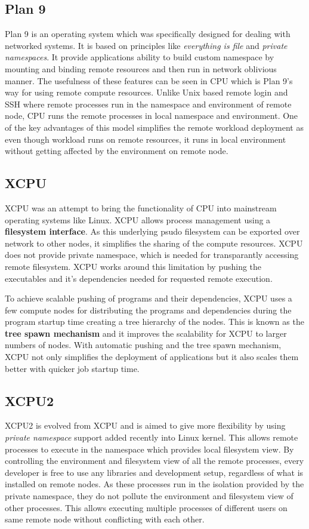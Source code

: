 \documentclass[conference]{IEEEtran}
\begin{document}
\subsection{Plan 9}
Plan 9 is an operating system which was specifically designed for dealing with
networked systems.  It is based on principles like \textit{everything is file}
and \textit{private namespaces}\cite{namespace}.  It provide applications
ability to build custom namespace by mounting and binding remote resources and
then run in network oblivious manner.  The usefulness of these features can be
seen in CPU\cite{plan9-cpu} which is Plan 9's way for using remote compute
resources.  Unlike Unix based remote login and SSH where remote processes run
in the namespace and environment of remote node, CPU runs the remote processes
in local namespace and environment.  One of the key advantages of this model
simplifies the remote workload deployment as even though workload runs on
remote resources, it runs in local environment without getting affected by the
environment on remote node.

\subsection{XCPU}
XCPU\cite{ron-xcpu} \cite{lucho-xcpu} was an attempt to bring the functionality
of CPU into mainstream operating systems like Linux.  XCPU allows process
management using a \textbf{filesystem interface}.  As this underlying psudo
filesystem can be exported over network to other nodes, it simplifies the
sharing of the compute resources.  XCPU does not provide private namespace,
which is needed for transparantly accessing remote filesystem.  XCPU works
around this limitation by pushing the executables and it's dependencies needed
for requested remote execution.

To achieve scalable pushing of programs and their dependencies, XCPU uses a few
compute nodes for distributing the programs and dependencies during the program
startup time creating a tree hierarchy of the nodes.  This is known as the
\textbf{tree spawn mechanism} and it improves the scalability for XCPU to
larger numbers of nodes. With automatic pushing and the tree spawn mechanism,
XCPU not only simplifies the deployment of applications but it also scales
them better with quicker job startup time.

\subsection{XCPU2}
XCPU2 \cite{lucho-xcpu2} is evolved from XCPU and is aimed to give more
flexibility by using \textit{private namespace} support added recently into
Linux kernel\cite{linuxns}.  This allows remote processes to execute in the
namespace which provides local filesystem view.  By controlling the
environment and filesystem view of all the remote processes, every developer
is free to use any libraries and development setup, regardless of what is
installed on remote nodes.  As these processes run in the isolation provided by
the private namespace, they do not pollute the environment and filesystem view
of other processes.  This allows executing multiple processes of different
users on same remote node without conflicting with each other.
\end{document}
